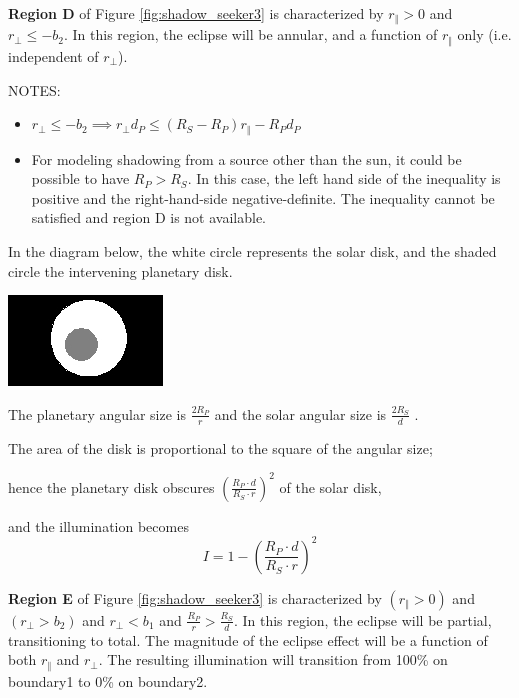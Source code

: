    \textbf{Region D} of Figure \ref{fig:shadow_seeker3} is characterized by
   $r_\Vert>0$ and $r_\bot \leqslant -b_{2}$.  In this region, the eclipse will
   be annular, and a function of $r_\Vert$ only (i.e. independent of $r_\bot$).

   NOTES:
   \begin{itemize}
    \item $r_\bot \leqslant -b_{2} \implies r_\bot d_P \leqslant (R_S - R_P)
           r_\Vert - R_P d_P$
    \item For modeling shadowing from a source other than the sun, it could
          be possible to have $R_P > R_S$.  In this case, the left hand side
          of the inequality is positive and the right-hand-side negative-definite.
          The inequality cannot be satisfied and region D is not available.
   \end{itemize}


   In the diagram below, the white circle represents the solar disk, and the
   shaded circle the intervening planetary disk.

   \includegraphics{figs/shadow/shadow_seeker_fig8.jpg}

   The planetary angular size is  $\frac{2R_{P}}{r}$
   and the solar angular size is  $\frac{2R_{S}}{d}$ .

   The area of the disk is proportional to the square of the angular size;

   hence the planetary disk obscures
   $\left(\frac{R_{P} \cdot d}{R_{S} \cdot r}\right)^{2}$ of the solar disk,

   and the illumination becomes
   \begin{equation*}
   I=1-\left(\frac{R_{P} \cdot d}{R_{S} \cdot r}\right)^{2}
   \end{equation*}

   \bigskip

   \textbf{Region E} of Figure \ref{fig:shadow_seeker3} is characterized by
   $(r_\Vert>0)$ and $(r_\bot>b_{2})$ and $r_\bot<b_{1}$ and
   $\frac{R_P}{r} > \frac{R_S}{d}$.  In this
   region, the eclipse will be partial, transitioning to total.  The magnitude of
   the eclipse effect will be a function of both $r_\Vert$ and $r_\bot$.  The
   resulting illumination will transition from 100\% on
   boundary1 to 0\% on boundary2.

